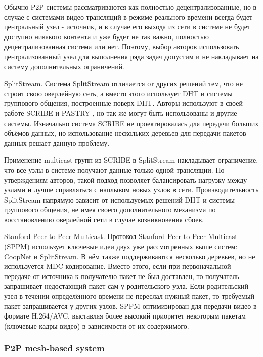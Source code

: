 		Обычно P2P-системы рассматриваются как полностью децентрализованные, но в случае с системами видео-трансляций в
		режиме реального времени всегда будет центральный узел - источник, и в случае его выхода из сети в системе не
		будет доступно никакого контента и уже будет не так важно, полностью децентрализованная система или нет.
		Поэтому, выбор авторов использовать централизованный узел для выполнения ряда задач допустим и не накладывает на
		систему дополнительных ограничений.

		SplitStream. Система SplitStream \cite{945474} отличается от других решений тем, что не строит свою оверлейную сеть, а вместо
		этого использует DHT и системы группового общения, построенные поверх DHT. Авторы используют в своей работе SCRIBE \cite{1038579} и
		PASTRY \cite{Rowstron2001}, но так же могут быть использованы и другие системы. Изначально система SCRIBE не проектировалась для
		передачи больших объёмов данных, но использование нескольких деревьев для передачи пакетов данных решает данную
		проблему.

		Применение multicast-групп из SCRIBE в SplitStream накладывает ограничение, что все узлы в системе получают
		данные только одной трансляции. По утверждениям авторов, такой подход позволяет балансировать нагрузку между
		узлами и лучше справляться с наплывом новых узлов в сети. Производительность SplitStream напрямую зависит от
		используемых решений DHT и системы группового общения, не имея своего дополнительного механизма по
		восстановлению оверлейной сети в случае возникновения сбоев.

		Stanford Peer-to-Peer Multicast. Протокол Stanford Peer-to-Peer Multicast (SPPM) \cite{5167392} использует ключевые идеи двух уже рассмотренных выше систем:
		CoopNet и SplitStream. В нём также поддерживаются несколько деревьев, но не используется MDC кодирование.
		Вместо этого, если при первоначальной передаче от источника к получателю пакет не был доставлен, то получатель
		запрашивает недостающий пакет сам у родительского узла. Если родительский узел в течении определённого времени
		не переслал нужный пакет, то требуемый пакет запрашивается у других узлов. SPPM оптимизирован для передачи
		видео в формате H.264/AVC, выставляя более высокий приоритет некоторым пакетам (ключевые кадры видео) в
		зависимости от их содержимого.

		\subsubsection{P2P mesh-based system}

